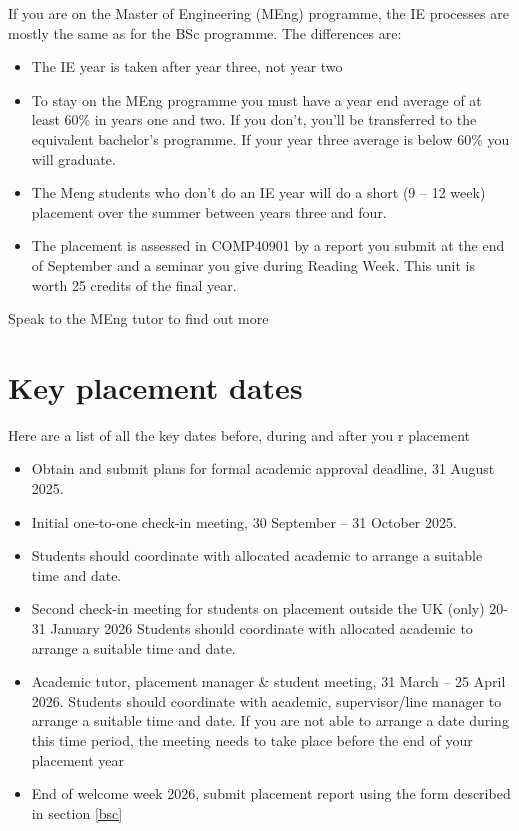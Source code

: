 \documentclass[
]{book}
\providecommand{\tightlist}{%
  \setlength{\itemsep}{0pt}\setlength{\parskip}{0pt}}
\begin{document}
If you are on the Master of Engineering (MEng) programme, the IE processes are mostly the same as for the BSc programme. The differences are:

\begin{itemize}
\tightlist
\item
  The IE year is taken after year three, not year two
\item
  To stay on the MEng programme you must have a year end average of at least 60\% in years one and two. If you don't, you'll be transferred to the equivalent bachelor's programme. If your year three average is below 60\% you will graduate.
\item
  The Meng students who don't do an IE year will do a short (9 -- 12 week) placement over the summer between years three and four.
\item
  The placement is assessed in COMP40901 by a report you submit at the end of September and a seminar you give during Reading Week. This unit is worth 25 credits of the final year.
\end{itemize}

Speak to the MEng tutor to find out more

\chapter{Key placement dates}\label{keydates}

Here are a list of all the key dates before, during and after you r placement

\begin{itemize}
\tightlist
\item
  Obtain and submit plans for formal academic approval deadline, 31 August 2025.
\item
  Initial one-to-one check-in meeting, 30 September -- 31 October 2025.
\item
  Students should coordinate with allocated academic to arrange a suitable time and date.
\item
  Second check-in meeting for students on placement outside the UK (only) 20-31 January 2026 Students should coordinate with allocated academic to arrange a suitable time and date.
\item
  Academic tutor, placement manager \& student meeting, 31 March -- 25 April 2026. Students should coordinate with academic, supervisor/line manager to arrange a suitable time and date. If you are not able to arrange a date during this time period, the meeting needs to take place before the end of your placement year
\item
  End of welcome week 2026, submit placement report using the form described in section \ref{bsc}
\end{itemize}
\end{document}
